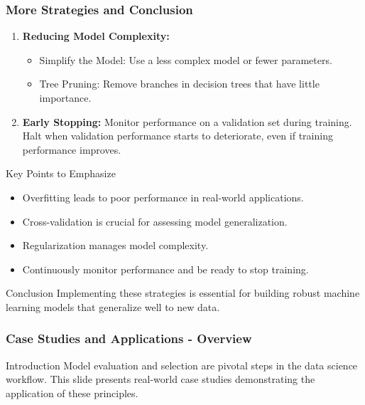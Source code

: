 \documentclass{beamer}
\begin{document}
\begin{frame}[fragile]
    \frametitle{More Strategies and Conclusion}
    \begin{enumerate}[resume]
        \item \textbf{Reducing Model Complexity:}
        \begin{itemize}
            \item Simplify the Model: Use a less complex model or fewer parameters.
            \item Tree Pruning: Remove branches in decision trees that have little importance.
        \end{itemize}
        
        \item \textbf{Early Stopping:} Monitor performance on a validation set during training. Halt when validation performance starts to deteriorate, even if training performance improves.
        
    \end{enumerate}
    
    \begin{block}{Key Points to Emphasize}
        \begin{itemize}
            \item Overfitting leads to poor performance in real-world applications.
            \item Cross-validation is crucial for assessing model generalization.
            \item Regularization manages model complexity.
            \item Continuously monitor performance and be ready to stop training.
        \end{itemize}
    \end{block}
    
    \begin{block}{Conclusion}
        Implementing these strategies is essential for building robust machine learning models that generalize well to new data.
    \end{block}
\end{frame}

\begin{frame}[fragile]
    \frametitle{Case Studies and Applications - Overview}
    \begin{block}{Introduction}
        Model evaluation and selection are pivotal steps in the data science workflow. 
        This slide presents real-world case studies demonstrating the application of these principles.
    \end{block}
\end{frame}
\end{document}
